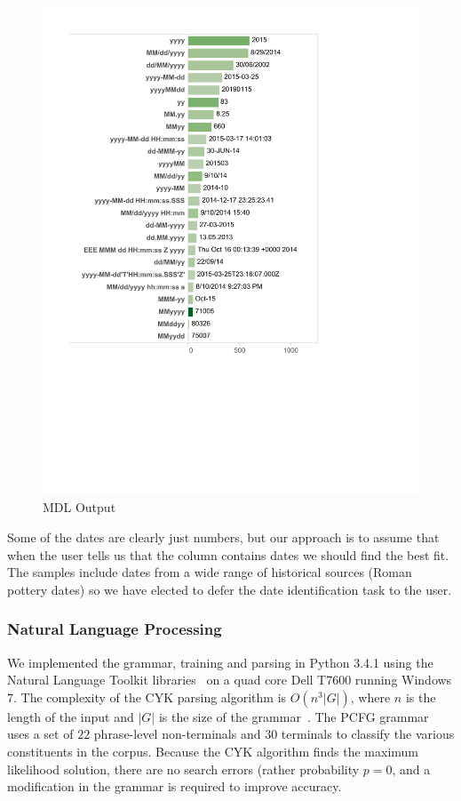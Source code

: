 \begin{figure}[ht]
\centering
\includegraphics[width=\columnwidth]{figures/FigureM3}
\caption{MDL Output}
\label{fig:M3}
\end{figure}


Some of the dates are clearly just numbers, but our approach is to assume that when the user tells us that the column contains dates we should find the best fit. The samples include dates from a wide range of historical sources (\eg Roman pottery dates) so we have elected to defer the date identification task to the user.

\subsubsection{Natural Language Processing}
We implemented the grammar, training and parsing in Python 3.4.1 using the Natural Language Toolkit libraries~\cite{nltk} on a quad core Dell T7600 running Windows 7. The complexity of the CYK parsing algorithm is $O(n^{3}|G|)$, where $n$ is the length of the input and $|G|$ is the size of the grammar~\cite{Younger67}. The PCFG grammar uses a set of $22$ phrase-level non-terminals and $30$ terminals to classify the various constituents in the corpus. Because the CYK algorithm finds the maximum likelihood solution, there are no search errors (rather probability $p = 0$, and a modification in the grammar is required to improve accuracy.

